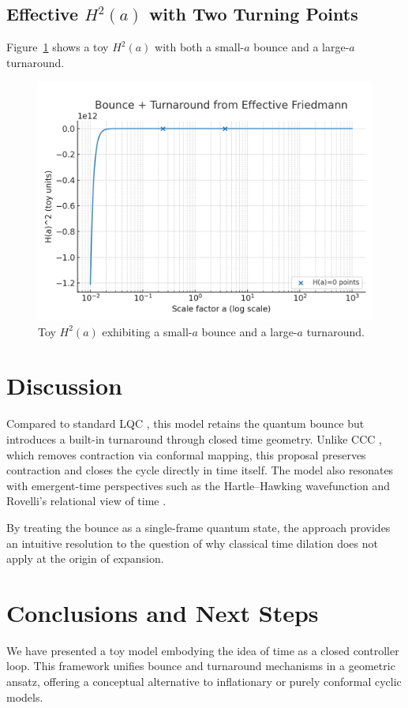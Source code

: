 \documentclass[12pt]{article}
\begin{document}
\subsection{Effective $H^2(a)$ with Two Turning Points}
Figure~\ref{fig:h2a} shows a toy $H^2(a)$ with both a small-$a$ bounce and a large-$a$ turnaround.

\begin{figure}[h]
\centering
\includegraphics[width=0.7\linewidth]{figures/plot_H2.png}
\caption{Toy $H^2(a)$ exhibiting a small-$a$ bounce and a large-$a$ turnaround.}
\label{fig:h2a}
\end{figure}

\section{Discussion}
Compared to standard LQC \cite{Ashtekar2006}, this model retains the quantum bounce but introduces 
a built-in turnaround through closed time geometry. Unlike CCC \cite{Penrose2010}, which removes 
contraction via conformal mapping, this proposal preserves contraction and closes the cycle 
directly in time itself. The model also resonates with emergent-time perspectives such as the 
Hartle--Hawking wavefunction \cite{Hartle1983} and Rovelli's relational view of time \cite{Rovelli2017}. 

By treating the bounce as a single-frame quantum state, the approach provides an intuitive resolution 
to the question of why classical time dilation does not apply at the origin of expansion.

\section{Conclusions and Next Steps}
We have presented a toy model embodying the idea of time as a closed controller loop. This framework 
unifies bounce and turnaround mechanisms in a geometric ansatz, offering a conceptual alternative to 
inflationary or purely conformal cyclic models. 
\end{document}

